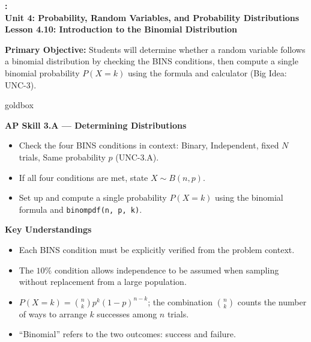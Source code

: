 \documentclass[10pt]{article}
\newcommand{\UnitNumberName}{Unit 4: Probability, Random Variables, and Probability Distributions \quad}
\newcommand{\LessonNumberName}{Lesson 4.10: Introduction to the Binomial Distribution}
\begin{document}
\begin{center}
    {\Large\bfseries \CourseName: \SchoolYear \\
    {\small\bfseries \UnitNumberName \LessonNumberName}}
\end{center}

\begin{tcolorbox}[colback=sky, colframe=navy, boxrule=0.9pt, arc=2mm,
    left=2mm, right=2mm, top=1.5mm, bottom=1.5mm]
    \textbf{Primary Objective:} Students will determine whether a random variable follows
    a binomial distribution by checking the BINS conditions, then compute a single
    binomial probability $P(X = k)$ using the formula and calculator (Big Idea: UNC-3).
\end{tcolorbox}

\renewcommand{\arraystretch}{1.6}
\begin{skillbox}{goldbox}
\begin{minipage}[t]{0.48\linewidth}
    \textbf{AP Skill 3.A --- Determining Distributions}
    \begin{itemize}
        \item Check the four BINS conditions in context: Binary, Independent, fixed
              $N$ trials, Same probability $p$ (UNC-3.A).
        \item If all four conditions are met, state $X \sim B(n, p)$.
        \item Set up and compute a single probability $P(X = k)$ using the binomial
              formula and \texttt{binompdf(n, p, k)}.
    \end{itemize}
\end{minipage}
\hfill
\begin{minipage}[t]{0.48\linewidth}
    \textbf{Key Understandings}
    \begin{itemize}
        \item Each BINS condition must be explicitly verified from the problem context.
        \item The $10\%$ condition allows independence to be assumed when sampling
              without replacement from a large population.
        \item $P(X = k) = \binom{n}{k} p^k (1-p)^{n-k}$; the combination
              $\binom{n}{k}$ counts the number of ways to arrange $k$ successes
              among $n$ trials.
        \item ``Binomial'' refers to the two outcomes: success and failure.
    \end{itemize}
\end{minipage}
\end{skillbox}
\end{document}
